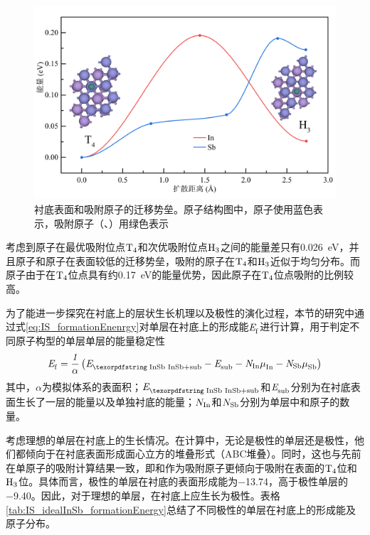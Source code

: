 \begin{figure}[htb]
    \includegraphics{pic/IS_DFT_adatomDiff.png}
    \caption{衬底表面和吸附原子的迁移势垒。原子结构图中，原子使用蓝色表示，吸附原子（、）用绿色表示}
    \label{fig:IS_DFT_adatomDiff}
\end{figure}

考虑到原子在最优吸附位点$\rm T_{4} \it$和次优吸附位点$\rm H_{3} \it$之间的能量差只有\SI{0.026}{\electronvolt}，并且原子和原子在表面较低的迁移势垒，吸附的原子在$\rm T_{4} \it$和$\rm H_{3} \it$近似于均匀分布。而原子由于在$\rm T_{4} \it$位点具有约\SI{0.17}{\electronvolt}的能量优势，因此原子在$\rm T_{4} \it$位点吸附的比例较高。

为了能进一步探究在衬底上的层状生长机理以及极性的演化过程，本节的研究中通过式\eqref{eq:IS_formationEnenrgy}对单层在衬底上的形成能$\it E_{\rm f}^{\rm } \it$进行计算，用于判定不同原子构型的单层单层的能量稳定性\chinesecolon
\begin{equation}
    \label{eq:IS_formationEnenrgy}
    \energyVar{f}{}=\frac{1}{\alpha}\left(\energyVar{\cemb{InSb}+sub}{}-\energyVar{sub}{}-N_{\rm In}\muVar{In}{}-N_{\rm Sb}\muVar{Sb}{}\right)
\end{equation}
其中，$\alpha$为模拟体系的表面积；$\energyVar{\cemb{InSb}+sub}{}$和$\it E_{\rm sub}^{\rm } \it$分别为在衬底表面生长了一层的能量以及单独衬底的能量；$N_{\rm In}$和$N_{\rm Sb}$分别为单层中和原子的数量。

考虑理想的单层在衬底上的生长情况。在计算中，无论是极性的单层还是极性，他们都倾向于在衬底表面形成面心立方的堆叠形式（ABC堆叠）。同时，这也与先前在单原子的吸附计算结果一致，即和作为吸附原子更倾向于吸附在表面的$\rm T_{4} \it$位和$\rm H_{3} \it$位。具体而言，极性的单层在衬底的表面形成能为\SI{-13.74}{\mievpas}，高于极性单层的\SI{-9.40}{\mievpas}。因此，对于理想的单层，在衬底上应生长为极性。表格\ref{tab:IS_idealInSb_formationEnergy}总结了不同极性的单层在衬底上的形成能及原子分布。

